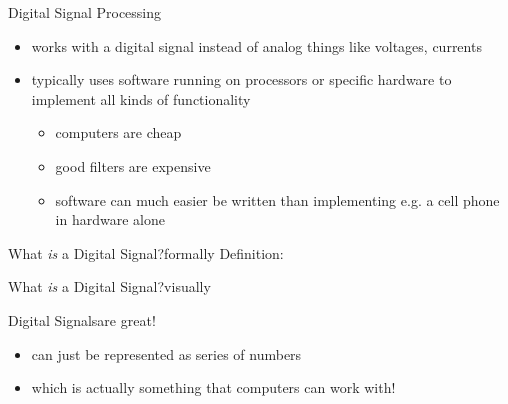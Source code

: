\documentclass{beamer}
\begin{document}
\begin{frame}{Digital Signal Processing}
\begin{itemize}
  \item works with a digital signal instead of analog things like voltages, currents
  \item typically uses software running on processors or specific hardware to implement all kinds of functionality
    \begin{itemize}
      \item computers are cheap
      \item good filters are expensive
      \item software can much easier be written than implementing e.g. a cell phone in hardware alone
    \end{itemize}
\end{itemize}
\end{frame}

\begin{frame}{What \textit{is} a Digital Signal?}{formally}
  Definition:\\[3em]


\end{frame}

\begin{frame}{What \textit{is} a Digital Signal?}{visually}





\end{frame}

\begin{frame}{Digital Signals}{are great!}
  \begin{itemize}
  \item can just be represented as series of numbers\\
\item<3-> which is actually something that computers can work with!
  \end{itemize}
\end{frame}
\end{document}
